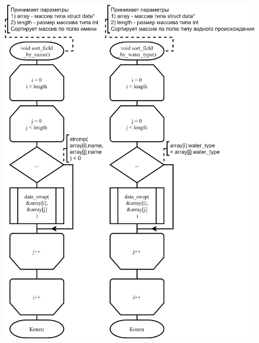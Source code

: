 \begin{figure}[!htp]
    \includegraphics{../src/submenu/sort_elements/sort_elements-3.png}
\end{figure}

